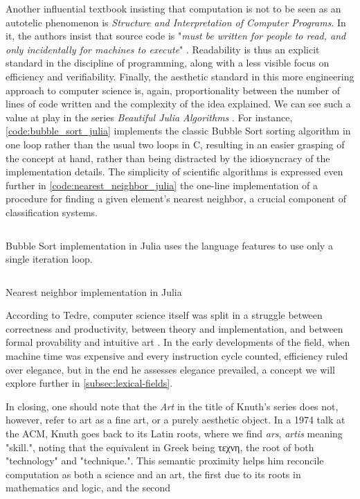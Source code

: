 Another influential textbook insisting that computation is not to be seen as an autotelic phenomenon is \emph{Structure and Interpretation of Computer Programs}. In it, the authors insist that source code is "\emph{must be written for people to read, and only incidentally for machines to execute}" \citep{abelson_structure_1979}. Readability is thus an explicit standard in the discipline of programming, along with a less visible focus on efficiency and verifiability. Finally, the aesthetic standard in this more engineering approach to computer science is, again, proportionality between the number of lines of code written and the complexity of the idea explained. We can see such a value at play in the series \emph{Beautiful Julia Algorithms} \citep{moss_beautifulalgorithms_2022}. For instance, \ref{code:bubble_sort_julia} implements the classic Bubble Sort sorting algorithm in one loop rather than the usual two loops in C, resulting in an easier grasping of the concept at hand, rather than being distracted by the idiosyncracy of the implementation details. The simplicity of scientific algorithms is expressed even further in \ref{code:nearest_neighbor_julia} the one-line implementation of a procedure for finding a given element's nearest neighbor, a crucial component of classification systems.

\begin{listing}
  \inputminted{julia}{./corpus/bubblesort.jl}
  \caption{Bubble Sort implementation in Julia uses the language features to use only a single iteration loop.}
  \label{code:bubble_sort_julia}
\end{listing}

\begin{listing}
  \inputminted{julia}{./corpus/nearest_neighbor.jl}
  \caption{Nearest neighbor implementation in Julia}
  \label{code:nearest_neighbor_julia}
\end{listing}

According to Tedre, computer science itself was split in a struggle between correctness and productivity, between theory and implementation, and between formal provability and intuitive art \citep{tedre_science_2014}. In the early developments of the field, when machine time was expensive and every instruction cycle counted, efficiency ruled over elegance, but in the end he assesses elegance prevailed, a concept we will explore further in \ref{subsec:lexical-fields}.

In closing, one should note that the \emph{Art} in the title of Knuth's series does not, however, refer to art as a fine art, or a purely aesthetic object. In a 1974 talk at the ACM, Knuth goes back to its Latin roots, where we find \emph{ars}, \emph{artis} meaning "skill.", noting that the equivalent in Greek being τεχνη, the root of both "technology" and "technique.". This semantic proximity helps him reconcile computation as both a science and an art, the first due to its roots in mathematics and logic, and the second

